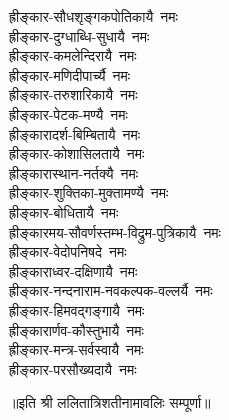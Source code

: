 \begin{multicols}{2}
\begin{flushleft}
ह्रीङ्कार-सौधशृङ्गकपोतिकायै~नमः\\
ह्रीङ्कार-दुग्धाब्धि-सुधायै~नमः\\
ह्रीङ्कार-कमलेन्दिरायै~नमः\\
ह्रीङ्कार-मणिदीपार्च्यै~नमः\\
ह्रीङ्कार-तरुशारिकायै~नमः\\
ह्रीङ्कार-पेटक-मण्यै~नमः\\
ह्रीङ्कारादर्श-बिम्बितायै~नमः\\
ह्रीङ्कार-कोशासिलतायै~नमः\\
ह्रीङ्कारास्थान-नर्तक्यै~नमः\hfill {}\\
ह्रीङ्कार-शुक्तिका-मुक्तामण्यै~नमः\\
ह्रीङ्कार-बोधितायै~नमः\\
ह्रीङ्कारमय-सौवर्णस्तम्भ-विद्रुम-पुत्रिकायै~नमः\\
ह्रीङ्कार-वेदोपनिषदे~नमः\\
ह्रीङ्काराध्वर-दक्षिणायै~नमः\\
ह्रीङ्कार-नन्दनाराम-नवकल्पक-वल्लर्यै~नमः\\
ह्रीङ्कार-हिमवद्गङ्गायै~नमः\\
ह्रीङ्कारार्णव-कौस्तुभायै~नमः\\
ह्रीङ्कार-मन्त्र-सर्वस्वायै~नमः\\
ह्रीङ्कार-परसौख्यदायै~नमः\hfill {}\\
\end{flushleft}
\end{multicols}
॥इति श्री ललितात्रिशतीनामावलिः सम्पूर्णा॥
